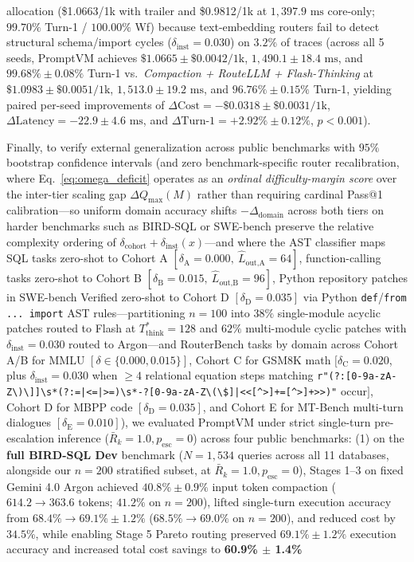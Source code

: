 \documentclass[conference,10pt]{IEEEtran}
\begin{document}
allocation (\$1.0663/1k with trailer and \$0.9812/1k at $1{,}397.9\text{ ms}$ core-only; $99.70\%$ Turn-1 / $100.00\%$ Wf) because text-embedding routers fail to detect structural schema/import cycles ($\delta_{\text{inst}}=0.030$) on $3.2\%$ of traces (across all 5 seeds, PromptVM achieves $\$1.0665 \pm \$0.0042/\text{1k}$, $1{,}490.1 \pm 18.4\text{ ms}$, and $99.68\% \pm 0.08\%$ Turn-1 vs.\ \textit{Compaction + RouteLLM + Flash-Thinking} at $\$1.0983 \pm \$0.0051/\text{1k}$, $1{,}513.0 \pm 19.2\text{ ms}$, and $96.76\% \pm 0.15\%$ Turn-1, yielding paired per-seed improvements of $\Delta\text{Cost} = -\$0.0318 \pm \$0.0031/\text{1k}$, $\Delta\text{Latency} = -22.9 \pm 4.6\text{ ms}$, and $\Delta\text{Turn-1} = +2.92\% \pm 0.12\%$, $p < 0.001$).

Finally, to verify external generalization across public benchmarks with $95\%$ bootstrap confidence intervals (and zero benchmark-specific router recalibration, where Eq.~\ref{eq:omega_deficit} operates as an \textit{ordinal difficulty-margin score} over the inter-tier scaling gap $\Delta Q_{\max}(M)$ rather than requiring cardinal Pass@1 calibration---so uniform domain accuracy shifts $-\Delta_{\text{domain}}$ across both tiers on harder benchmarks such as BIRD-SQL or SWE-bench preserve the relative complexity ordering of $\delta_{\text{cohort}} + \delta_{\text{inst}}(x)$---and where the AST classifier maps SQL tasks zero-shot to Cohort A $[\delta_{\text{A}}=0.000,\ \hat{L}_{\text{out,A}}=64]$, function-calling tasks zero-shot to Cohort B $[\delta_{\text{B}}=0.015,\ \hat{L}_{\text{out,B}}=96]$, Python repository patches in SWE-bench Verified zero-shot to Cohort D $[\delta_{\text{D}}=0.035]$ via Python \texttt{def}/\texttt{from ... import} AST rules---partitioning $n=100$ into $38\%$ single-module acyclic patches routed to Flash at $T_{\text{think}}^*=128$ and $62\%$ multi-module cyclic patches with $\delta_{\text{inst}}=0.030$ routed to Argon---and RouterBench tasks by domain across Cohort A/B for MMLU $[\delta \in \{0.000, 0.015\}]$, Cohort C for GSM8K math $[\delta_{\text{C}}=0.020$, plus $\delta_{\text{inst}}=0.030$ when $\ge 4$ relational equation steps matching \texttt{r"(?:[0-9a-zA-Z\textbackslash)\textbackslash]]\textbackslash s*(?:=|\allowbreak<=|\allowbreak>=)\textbackslash s*-?[0-9a-zA-Z\textbackslash(\textbackslash\$]|\allowbreak<<[\string^>]+=[\string^>]+>>)"} occur$]$, Cohort D for MBPP code $[\delta_{\text{D}}=0.035]$, and Cohort E for MT-Bench multi-turn dialogues $[\delta_{\text{E}}=0.010]$), we evaluated PromptVM under strict single-turn pre-escalation inference ($\bar{R}_k = 1.0, p_{\text{esc}} = 0$) across four public benchmarks: (1) on the \textbf{full BIRD-SQL Dev} benchmark \cite{bird2023} ($N = 1{,}534$ queries across all 11 databases, alongside our $n=200$ stratified subset, at $\bar{R}_k=1.0, p_{\text{esc}}=0$), Stages 1--3 on fixed Gemini 4.0 Argon achieved $40.8\% \pm 0.9\%$ input token compaction ($614.2 \to 363.6\text{ tokens}$; $41.2\%$ on $n=200$), lifted single-turn execution accuracy from $68.4\% \to 69.1\% \pm 1.2\%$ ($68.5\% \to 69.0\%$ on $n=200$), and reduced cost by $34.5\%$, while enabling Stage 5 Pareto routing preserved $69.1\% \pm 1.2\%$ execution accuracy and increased total cost savings to \textbf{60.9\% $\pm$ 1.4\%} 
\end{document}
